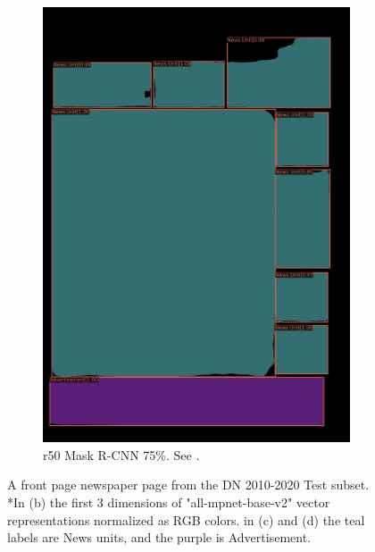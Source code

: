 \documentclass[oneside, english, bibtex]{kththesis}
\begin{document}
\begin{figure}[!htb]
\begin{adjustbox}{center,max size={\textwidth}{0.9\textheight}}
{\begin{subfigure}{0.6\textwidth}
\includegraphics[width=\linewidth]{figures/labels-vanilla-0.75/JIefsDa.jpg}
  \caption{r50 Mask R-CNN 75\%. See . }
  \label{fig:JIefsDa_pred}
\end{subfigure}}
\end{adjustbox}
  \caption{A front page newspaper page from the DN 2010-2020 Test subset. *In (b) the first 3 dimensions of "all-mpnet-base-v2" vector representations normalized as RGB colors. in (c) and (d) the teal labels are News units, and the purple is Advertisement.}
\label{fig:JIefsDa}
\end{figure}

\clearpage
\end{document}
